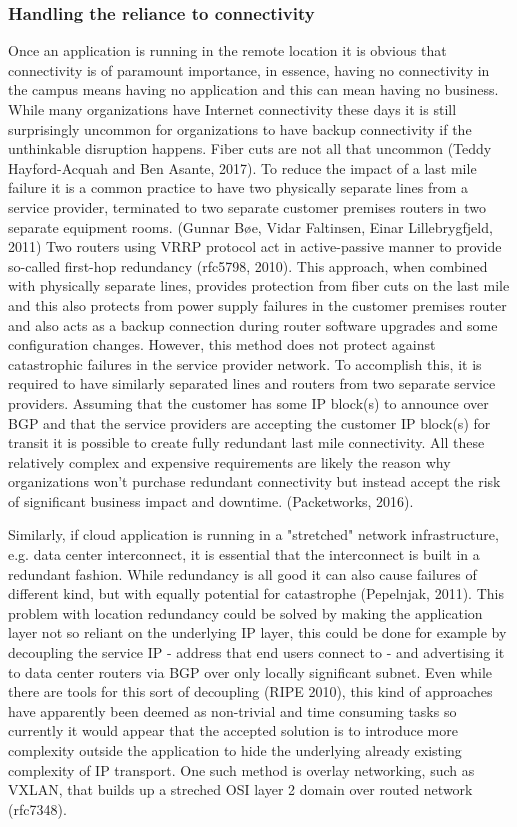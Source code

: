 \documentclass{article}
\begin{document}
\subsubsection{Handling the reliance to connectivity}
Once an application is running in the remote location it is obvious that connectivity is of paramount importance, in essence, having no connectivity in the campus means having no application and this can mean having no business. While many organizations have Internet connectivity these days it is still surprisingly uncommon for organizations to have backup connectivity if the unthinkable disruption happens. Fiber cuts are not all that uncommon (Teddy Hayford-Acquah and Ben Asante, 2017).
To reduce the impact of a last mile failure it is a common practice to have two physically separate lines from a service provider, terminated to two separate customer premises routers in two separate equipment rooms. (Gunnar Bøe, Vidar Faltinsen, Einar Lillebrygfjeld, 2011) Two routers using VRRP protocol act in active-passive manner to provide so-called first-hop redundancy (rfc5798, 2010). This approach, when combined with physically separate lines, provides protection from fiber cuts on the last mile and this also protects from power supply failures in the customer premises router and also acts as a backup connection during router software upgrades and some configuration changes.
However, this method does not protect against catastrophic failures in the service provider network. To accomplish this, it is required to have similarly separated lines and routers from two separate service providers. Assuming that the customer has some IP block(s) to announce over BGP and that the service providers are accepting the customer IP block(s) for transit it is possible to create fully redundant last mile connectivity. All these relatively complex and expensive requirements are likely the reason why organizations won't purchase redundant connectivity but instead accept the risk of significant business impact and downtime. (Packetworks, 2016).
\par
Similarly, if cloud application is running in a "stretched" network infrastructure, e.g. data center interconnect, it is essential that the interconnect is built in a redundant fashion. While redundancy is all good it can also cause failures of different kind, but with equally potential for catastrophe (Pepelnjak, 2011).
This problem with location redundancy could be solved by making the application layer not so reliant on the underlying IP layer, this could be done for example by decoupling the service IP - address that end users connect to - and advertising it to data center routers via BGP over only locally significant subnet. Even while there are tools for this sort of decoupling (RIPE 2010), this kind of approaches have apparently been deemed as non-trivial and time consuming tasks so currently it would appear that the accepted solution is to introduce more complexity outside the application to hide the underlying already existing complexity of IP transport. One such method is overlay networking, such as VXLAN, that builds up a streched OSI layer 2 domain over routed network (rfc7348).
\end{document}
